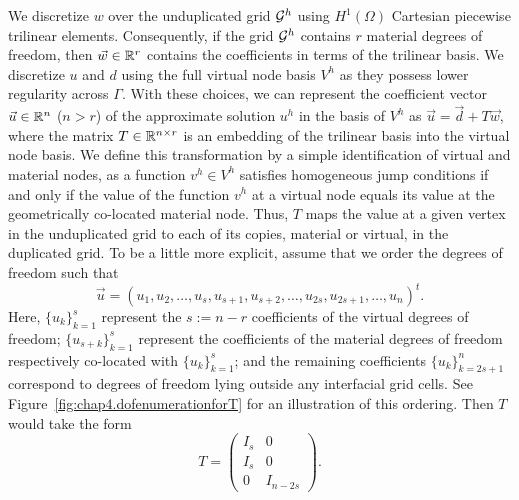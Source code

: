 We discretize $w$ over the unduplicated grid $\mathcal{G}^h$ using $H^1(\Omega)$ Cartesian piecewise trilinear elements. Consequently, if the grid $\mathcal{G}^h$ contains $r$ material degrees of freedom, then $\vec{w} \in \mathbb{R}^r$ contains the coefficients in terms of the trilinear basis. We discretize $u$ and $d$ using the full virtual node basis $V^h$ as they possess lower regularity across $\Gamma$. With these choices, we can represent the coefficient vector $\vec{u} \in \mathbb{R}^n$ ($n > r$) of the approximate solution $u^h$ in the basis of $V^h$ as $\vec{u} = \vec{d} + T \vec{w}$, where the matrix $T \in \mathbb{R}^{n \times r}$ is an embedding of the trilinear basis into the virtual node basis. We define this transformation by a simple identification of virtual and material nodes, as a function $v^h \in V^h$ satisfies homogeneous jump conditions if and only if the value of the function $v^h$ at a virtual node equals its value at the geometrically co-located material node. Thus, $T$ maps the value at a given vertex in the unduplicated grid to each of its copies, material or virtual, in the duplicated grid. To be a little more explicit, assume that we order the degrees of freedom such that
\begin{equation*}
\vec{u} = (u_1, u_2, \dotsc, u_s, u_{s+1}, u_{s+2}, \dotsc, u_{2s}, u_{2s+1}, \dotsc, u_n)^t.
\end{equation*}
Here, $\{u_k\}_{k=1}^s$ represent the $s := n - r$ coefficients of the virtual degrees of freedom; $\{u_{s+k}\}_{k=1}^s$ represent the coefficients of the material degrees of freedom respectively co-located with $\{u_k\}_{k=1}^s$; and the remaining coefficients $\{u_k\}_{k=2s+1}^n$ correspond to degrees of freedom lying outside any interfacial grid cells. See Figure~\ref{fig:chap4.dofenumerationforT} for an illustration of this ordering. Then $T$ would take the form
\begin{equation} \label{eq:chap4.interface.T}
T = \begin{pmatrix} I_s & 0 \\ I_s & 0  \\ 0 & I_{n-2s} \end{pmatrix}.
\end{equation}

